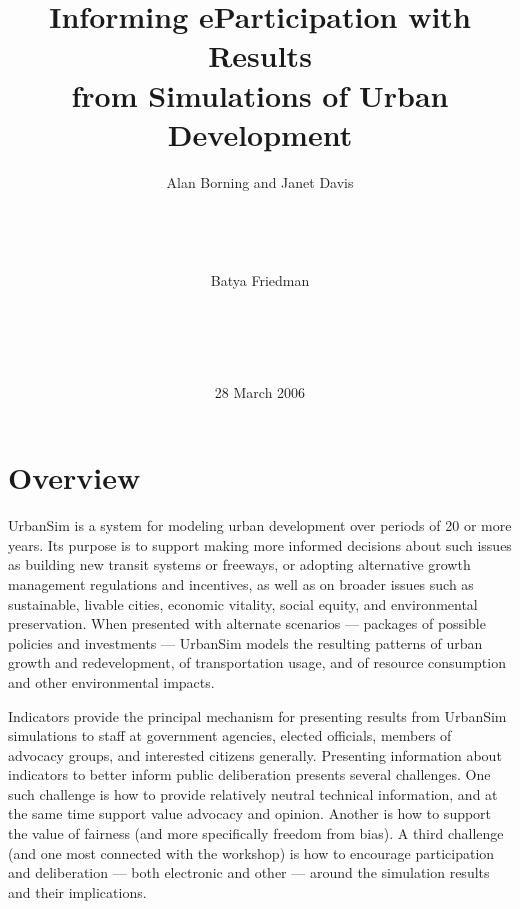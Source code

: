 \documentclass{acm_proc_article-sp}
\begin{document}
\title{Informing eParticipation with Results \\ 
from Simulations of Urban Development}


\author{
\alignauthor Alan Borning and Janet Davis\\
       \\
       \\
       \\
       \\
\alignauthor Batya Friedman\\
       \\
       \\
       \\
       \\
}
\date{28 March 2006}
\maketitle

\section{Overview}

UrbanSim is a system for modeling urban development over periods of 20 or
more years.  Its purpose is to support making more informed decisions about
such issues as building new transit systems or freeways, or adopting
alternative growth management regulations and incentives, as well as on
broader issues such as sustainable, livable cities, economic vitality,
social equity, and environmental preservation.  When presented with
alternate scenarios --- packages of possible policies and investments ---
UrbanSim models the resulting patterns of urban growth and redevelopment, of
transportation usage, and of resource consumption and other environmental
impacts.

Indicators provide the principal mechanism for presenting results from
UrbanSim simulations to staff at government agencies, elected officials,
members of advocacy groups, and interested citizens generally.  Presenting
information about indicators to better inform public deliberation presents
several challenges.  One such challenge is how to provide
relatively neutral technical information, and at the same time support
value advocacy and opinion.  Another is how to support the value of
fairness (and more specifically freedom from bias).  A third challenge (and
one most connected with the workshop) is how to encourage participation and
deliberation --- both electronic and other --- around the simulation
results and their implications.
\end{document}

